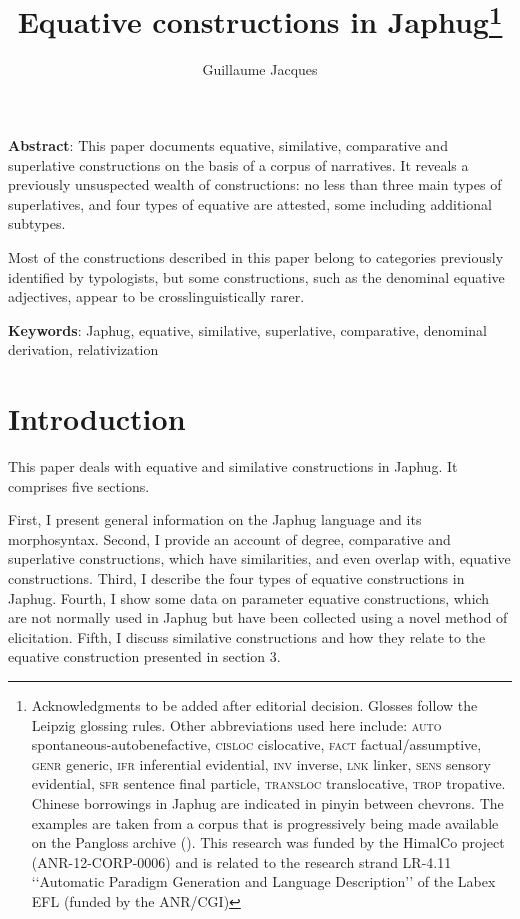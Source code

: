 \documentclass[oneside,a4paper,11pt]{article}
\begin{document}
 

\title{Equative constructions in Japhug\footnote{Acknowledgments to be added after editorial decision. Glosses follow the Leipzig glossing rules. Other abbreviations used here include: \textsc{auto} spontaneous-autobenefactive, \textsc{cisloc} cislocative,  \textsc{fact} factual/assumptive, \textsc{genr} generic, \textsc{ifr} inferential evidential,  \textsc{inv} inverse, \textsc{lnk} linker,  \textsc{sens} sensory  evidential, \textsc{sfr} sentence final particle, \textsc{transloc} translocative, \textsc{trop} tropative.  Chinese borrowings in Japhug are indicated in pinyin between chevrons. The examples are taken from a corpus that is progressively being made available on the Pangloss archive (\citealt{michailovsky14pangloss}). This research was funded by the HimalCo project (ANR-12-CORP-0006) and is related to the research strand LR-4.11 ‘‘Automatic Paradigm Generation and Language Description’’ of the Labex EFL (funded by the ANR/CGI) }}
\author{Guillaume Jacques}
\maketitle
\linenumbers

\textbf{Abstract}: This paper documents equative, similative, comparative and superlative constructions on the basis of a corpus of narratives. It reveals a previously unsuspected wealth of constructions: no less than three main types of superlatives, and four types of equative are attested, some including additional subtypes.

Most of the constructions described in this paper belong to categories previously identified by typologists, but some constructions, such as the denominal equative adjectives, appear to be crosslinguistically rarer.

\textbf{Keywords}: Japhug, equative, similative, superlative, comparative, denominal derivation, relativization
\section*{Introduction}
This paper deals with equative and similative constructions in Japhug. It comprises five sections.

 First, I present general information on the Japhug language and its morphosyntax. Second, I provide an account of degree, comparative and superlative constructions, which have similarities, and even overlap with, equative constructions. Third, I describe the four types of equative constructions in Japhug. Fourth, I show some data on parameter equative constructions, which are not normally used in Japhug but have been collected using a novel method of elicitation.  Fifth, I discuss similative constructions and how they relate to the equative construction presented in section 3.
\end{document}
